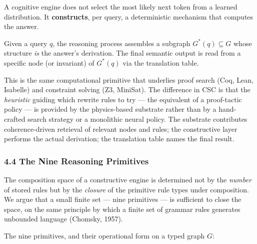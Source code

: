 \documentclass[
  11pt,
  a4paper,
]{article}
\begin{document}
A cognitive engine does not select the most likely next token from a
learned distribution. It \textbf{constructs}, per query, a deterministic
mechanism that computes the answer.

Given a query \(q\), the reasoning process assembles a subgraph
\(G^*(q) \subseteq G\) whose structure \emph{is} the answer's
derivation. The final semantic output is read from a specific node (or
invariant) of \(G^*(q)\) via the translation table.

This is the same computational primitive that underlies proof search
(Coq, Lean, Isabelle) and constraint solving (Z3, MiniSat). The
difference in CSC is that the \emph{heuristic} guiding which rewrite
rules to try --- the equivalent of a proof-tactic policy --- is provided
by the physics-based substrate rather than by a hand-crafted search
strategy or a monolithic neural policy. The substrate contributes
coherence-driven retrieval of relevant nodes and rules; the constructive
layer performs the actual derivation; the translation table names the
final result.

\subsubsection{4.4 The Nine Reasoning
Primitives}\label{the-nine-reasoning-primitives}

The composition space of a constructive engine is determined not by the
\emph{number} of stored rules but by the \emph{closure} of the primitive
rule types under composition. We argue that a small finite set --- nine
primitives --- is sufficient to close the space, on the same principle
by which a finite set of grammar rules generates unbounded language
(Chomsky, 1957).

The nine primitives, and their operational form on a typed graph \(G\):
\end{document}
